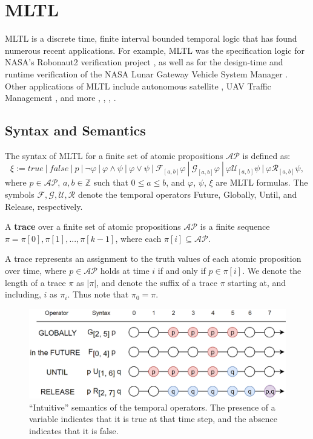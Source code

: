 \documentclass[runningheads]{llncs}
\renewcommand{\phi}{\varphi}
\begin{document}
\section{MLTL}
\label{sec:mltl}
MLTL is a discrete time, finite interval bounded temporal logic that has found numerous recent applications. 
For example, MLTL was the specification logic for NASA's Robonaut2 verification project \cite{KZJZR20}, as well as for the design-time and runtime verification of the NASA Lunar Gateway Vehicle System Manager \cite{DBR21}.
Other applications of MLTL include autonomous satellite \cite{JAXA}, UAV Traffic Management \cite{HCHJR21}, and more \cite{HLR21}, \cite{LLR21}, \cite{LJBHCLR22}, \cite{AJR22}. 

\subsection{Syntax and Semantics}
The syntax of MLTL for a finite set of atomic propositions $\mathcal{AP}$ is defined as: 
$$ 
\xi := 
true \ | 
\ false \ | 
\ p \ | 
\ \neg \phi \ | 
\ \phi \land \psi \ | 
\ \phi \lor \psi \ | 
\ \mathcal{F}_{[a,b]} \phi \ | 
\ \mathcal{G}_{[a,b]} \phi \ | 
\ \phi \mathcal{U}_{[a,b]} \psi \ | 
\ \phi \mathcal{R}_{[a,b]} \psi, 
$$
where $p \in \mathcal{AP}$, $a, b \in \mathbb{Z}$ such that $0 \leq a \leq b$, and $\phi$, $\psi$, $\xi$ are MLTL formulas. 
The symbols $\mathcal{F},\mathcal{G},\mathcal{U},\mathcal{R}$ denote the temporal operators Future, Globally, Until, and Release, respectively.

\begin{definition}
    A \textbf{trace} over a finite set of atomic propositions $\mathcal{AP}$ is a finite sequence $\pi = \pi[0], \pi[1], ..., \pi[k-1]$, where each $\pi[i] \subseteq \mathcal{AP}$. 
\end{definition}

A trace represents an assignment to the truth values of each atomic proposition over time, where $p \in \mathcal{AP}$ holds at time $i$ if and only if $p \in \pi[i]$. 
We denote the length of a trace $\pi$ as $|\pi|$, and denote the suffix of a trace $\pi$ starting at, and including, $i$ as $\pi_i$.
Thus note that $\pi_0 = \pi$. 

\begin{figure}[h]
\centering
\includegraphics[width=\linewidth]{figs/temporal_operators.png}
\caption{``Intuitive'' semantics of the temporal operators. The presence of a variable indicates that it is true at that time step, and the absence indicates that it is false.}
\label{fig:temporal_operators}
\end{figure}
\end{document}

